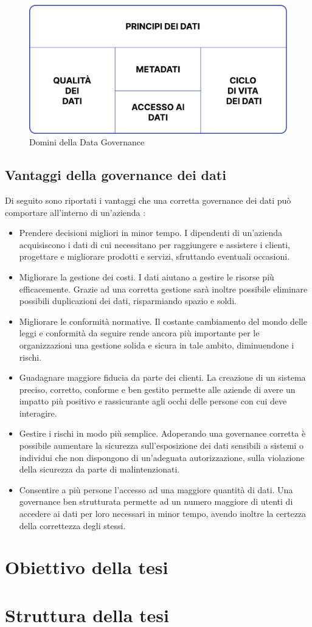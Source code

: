 \begin{figure}[!h]
    \centering
    \includegraphics[width=0.75\linewidth]{figure/capitolo_1/Data Governance Dominions.pdf}
    \caption{Domini della Data Governance}
    \label{fig:Data Governance Dominions}
\end{figure}

\subsection{Vantaggi della governance dei dati}

Di seguito sono riportati i vantaggi che una corretta governance dei dati può comportare all'interno di un'azienda \cite{google_data_governance}:
\begin{itemize}
    \item Prendere decisioni migliori in minor tempo. I dipendenti di un'azienda acquisiscono i dati di cui necessitano per raggiungere e assistere i clienti, progettare e migliorare prodotti e servizi, sfruttando eventuali occasioni.
    \item Migliorare la gestione dei costi. I dati aiutano a gestire le risorse più efficacemente. Grazie ad una corretta gestione sarà inoltre possibile eliminare possibili duplicazioni dei dati, risparmiando spazio e soldi.
    \item Migliorare le conformità normative. Il costante cambiamento del mondo delle leggi e conformità da seguire rende ancora più importante per le organizzazioni una gestione solida e sicura in tale ambito, diminuendone i rischi.
    \item Guadagnare maggiore fiducia da parte dei clienti. La creazione di un sistema preciso, corretto, conforme e ben gestito permette alle aziende di avere un impatto più positivo e rassicurante agli occhi delle persone con cui deve interagire.
    \item Gestire i rischi in modo più semplice. Adoperando una governance corretta è possibile aumentare la sicurezza sull'esposizione dei dati sensibili a sistemi o individui che non dispongono di un'adeguata autorizzazione, sulla violazione della sicurezza da parte di malintenzionati.
    \item Consentire a più persone l'accesso ad una maggiore quantità di dati. Una governance ben strutturata permette ad un numero maggiore di utenti di accedere ai dati per loro necessari in minor tempo, avendo inoltre la certezza della correttezza degli stessi.
\end{itemize}

\section{Obiettivo della tesi}

\section{Struttura della tesi}
